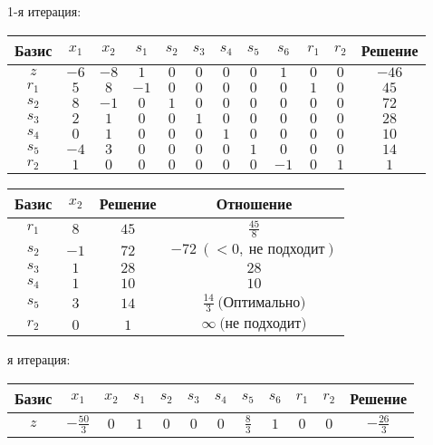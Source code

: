 \documentclass{article}%
\begin{document}
\begin{flushleft}%
1{-}я итерация: %
\newline%
\newline%
\renewcommand{\arraystretch}{1.3}%
\begin{tabular}{|c|cccccccccc|c|}%
\hline%
Базис&$x_{1}$&$x_{2}$&$s_{1}$&$s_{2}$&$s_{3}$&$s_{4}$&$s_{5}$&$s_{6}$&$r_{1}$&$r_{2}$&Решение\\%
\hline%
$z$&$-6$&$-8$&$1$&$0$&$0$&$0$&$0$&$1$&$0$&$0$&$-46$\\%
\hline%
$r_{1}$&$5$&$8$&$-1$&$0$&$0$&$0$&$0$&$0$&$1$&$0$&$45$\\%
$s_{2}$&$8$&$-1$&$0$&$1$&$0$&$0$&$0$&$0$&$0$&$0$&$72$\\%
$s_{3}$&$2$&$1$&$0$&$0$&$1$&$0$&$0$&$0$&$0$&$0$&$28$\\%
$s_{4}$&$0$&$1$&$0$&$0$&$0$&$1$&$0$&$0$&$0$&$0$&$10$\\%
$s_{5}$&$-4$&$3$&$0$&$0$&$0$&$0$&$1$&$0$&$0$&$0$&$14$\\%
$r_{2}$&$1$&$0$&$0$&$0$&$0$&$0$&$0$&$-1$&$0$&$1$&$1$\\%
\hline%
\end{tabular}%
\newline%
\newline%
\newline%
\begin{tabular}{|cccc|}%
\hline%
Базис&$x_{2}$&Решение&Отношение\\%
\hline%
$r_{1}$&$8$&$45$&$\frac{45}{8}$\\%
$s_{2}$&$-1$&$72$&$-72\: (< 0, \: \text{не подходит})$\\%
$s_{3}$&$1$&$28$&$28$\\%
$s_{4}$&$1$&$10$&$10$\\%
$s_{5}$&$3$&$14$&$\frac{14}{3}\: \text{(Оптимально)}$\\%
$r_{2}$&$0$&$1$&$\infty \: \text{(не подходит)}$\\%
\hline%
\end{tabular}%
\newline%
\newline%
я итерация: %
\newline%
\newline%
\renewcommand{\arraystretch}{1.3}%
\begin{tabular}{|c|cccccccccc|c|}%
\hline%
Базис&$x_{1}$&$x_{2}$&$s_{1}$&$s_{2}$&$s_{3}$&$s_{4}$&$s_{5}$&$s_{6}$&$r_{1}$&$r_{2}$&Решение\\%
\hline%
$z$&$-\frac{50}{3}$&$0$&$1$&$0$&$0$&$0$&$\frac{8}{3}$&$1$&$0$&$0$&$-\frac{26}{3}$\\%

\end{tabular}
\end{flushleft}
\end{document}
